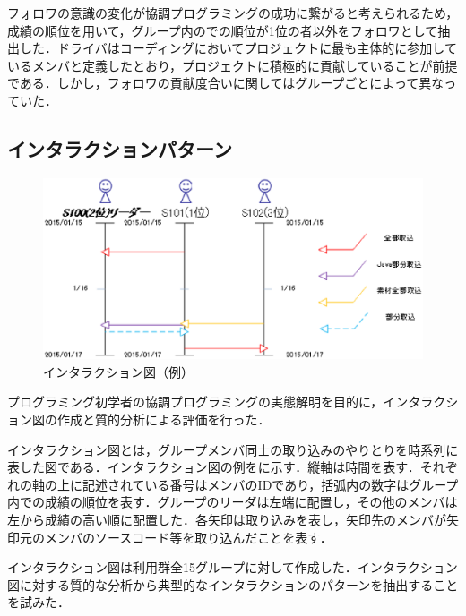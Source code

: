 フォロワの意識の変化が協調プログラミングの成功に繋がると考えられるため，成績の順位を用いて，グループ内のでの順位が1位の者以外をフォロワとして抽出した．ドライバはコーディングにおいてプロジェクトに最も主体的に参加しているメンバと定義したとおり，プロジェクトに積極的に貢献していることが前提である．しかし，フォロワの貢献度合いに関してはグループごとによって異なっていた．


\subsection{インタラクションパターン}


\begin{figure}[tb]
	\begin{center}
		\includegraphics[scale=0.4]{img/flowSample.eps}
		\caption{インタラクション図（例）}
		\label{fig:flowSample}
	\end{center}
\end{figure}


プログラミング初学者の協調プログラミングの実態解明を目的に，インタラクション図の作成と質的分析による評価を行った．

インタラクション図とは，グループメンバ同士の取り込みのやりとりを時系列に表した図である．インタラクション図の例をに示す．縦軸は時間を表す．それぞれの軸の上に記述されている番号はメンバのIDであり，括弧内の数字はグループ内での成績の順位を表す．グループのリーダ\footnotemark[3] は左端に配置し，その他のメンバは左から成績の高い順に配置した．各矢印は取り込みを表し，矢印先のメンバが矢印元のメンバのソースコード等を取り込んだことを表す．


インタラクション図は利用群全15グループに対して作成した．インタラクション図に対する質的な分析から典型的なインタラクションのパターンを抽出することを試みた．

